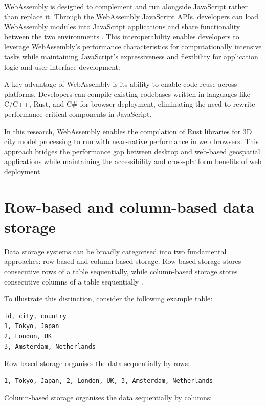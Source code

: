 WebAssembly is designed to complement and run alongside JavaScript rather than replace it. Through the WebAssembly JavaScript APIs, developers can load WebAssembly modules into JavaScript applications and share functionality between the two environments \citep{WebAssembly}. This interoperability enables developers to leverage WebAssembly's performance characteristics for computationally intensive tasks while maintaining JavaScript's expressiveness and flexibility for application logic and user interface development.

A key advantage of WebAssembly is its ability to enable code reuse across platforms. Developers can compile existing codebases written in languages like C/C++, Rust, and C\# for browser deployment, eliminating the need to rewrite performance-critical components in JavaScript.

In this research, WebAssembly enables the compilation of Rust libraries for 3D city model processing to run with near-native performance in web browsers. This approach bridges the performance gap between desktop and web-based geospatial applications while maintaining the accessibility and cross-platform benefits of web deployment.

\section{Row-based and column-based data storage}
\label{tb:row_based_column_based_data_storage}

Data storage systems can be broadly categorised into two fundamental approaches: row-based and column-based storage. Row-based storage stores consecutive rows of a table sequentially, while column-based storage stores consecutive columns of a table sequentially \citep{clickhouse_column}.

To illustrate this distinction, consider the following example table:

\begin{verbatim}
id, city, country
1, Tokyo, Japan
2, London, UK
3, Amsterdam, Netherlands
\end{verbatim}

Row-based storage organises the data sequentially by rows:

\begin{verbatim}
1, Tokyo, Japan, 2, London, UK, 3, Amsterdam, Netherlands
\end{verbatim}

Column-based storage organises the data sequentially by columns:

